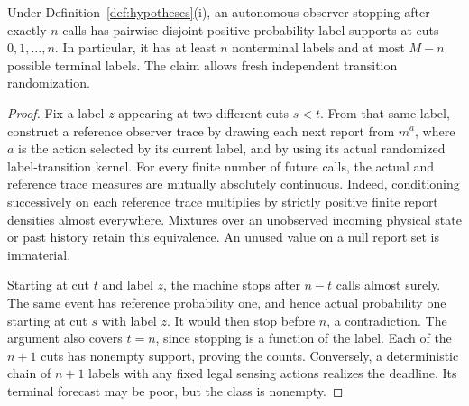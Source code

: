 \begin{lemma}\label{lem:clock}
Under Definition~\ref{def:hypotheses}(i), an autonomous observer stopping after exactly $n$ calls has pairwise disjoint positive-probability label supports at cuts $0,1,\ldots,n$. In particular, it has at least $n$ nonterminal labels and at most $M-n$ possible terminal labels. The claim allows fresh independent transition randomization.
\end{lemma}
\begin{proof}
Fix a label $z$ appearing at two different cuts $s<t$. From that same label, construct a reference observer trace by drawing each next report from $m^a$, where $a$ is the action selected by its current label, and by using its actual randomized label-transition kernel. For every finite number of future calls, the actual and reference trace measures are mutually absolutely continuous. Indeed, conditioning successively on each reference trace multiplies by strictly positive finite report densities almost everywhere. Mixtures over an unobserved incoming physical state or past history retain this equivalence. An unused value on a null report set is immaterial.

Starting at cut $t$ and label $z$, the machine stops after $n-t$ calls almost surely. The same event has reference probability one, and hence actual probability one starting at cut $s$ with label $z$. It would then stop before $n$, a contradiction. The argument also covers $t=n$, since stopping is a function of the label. Each of the $n+1$ cuts has nonempty support, proving the counts. Conversely, a deterministic chain of $n+1$ labels with any fixed legal sensing actions realizes the deadline. Its terminal forecast may be poor, but the class is nonempty.
\end{proof}

